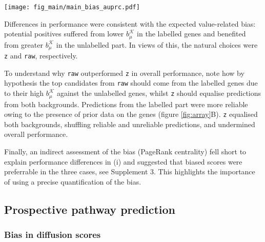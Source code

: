 \documentclass[final]{bioinfo}
\newcommand{\method}{\texttt}
\newcommand{\ebias}{b_{\mu}^{\mathcal{K}}}
\begin{document}
\begin{figure*}[!tpb]%
\centerline{
\texttt{[image: fig\_main/main\_bias\_auprc.pdf]}
}
\caption{Performance in the DLBCL dataset. 
\textbf{(A)} Expected value-related bias. 
Within the labelled genes of both arrays, those in pathways had lower $\ebias$ that those outside. 
Within the unlabelled genes, this tendency was inverted. 
Overall, labelled genes had higher $\ebias$ than unlabelled genes. 
\textbf{(B)} Predicted AUPRC (0.95 confidence interval) using the explanatory model in Table \ref{tab:datasets} and Supplement 3. 
Besides diffusion scores, three baselines were included: \method{original} (ranking by the p-values), \method{pagerank} and \method{random}. 
In both arrays (\textit{ALL} and \textit{Lym}), \method{raw} outperformed \method{z} in unlabelled nodes and overall, while \method{z} was preferable in the labelled genes. 
}\label{fig:array}
\end{figure*}

Differences in performance were consistent with the expected value-related bias: potential positives suffered from lower $\ebias$ in the labelled genes and benefited from greater $\ebias$ in the unlabelled part. 
In views of this, the natural choices were \method{z} and \method{raw}, respectively. 

To understand why \method{raw} outperformed \method{z} in overall performance, note how by hypothesis the top candidates from \method{raw} should come from the labelled genes due to their high $\ebias$ against the unlabelled genes, whilst \method{z} should equalise predictions from both backgrounds. 
Predictions from the labelled part were more reliable owing to the presence of prior data on the genes (figure \ref{fig:array}B). 
\method{z} equalised both backgrounds, shuffling reliable and unreliable predictions, and undermined overall performance. 

Finally, an indirect assessment of the bias (PageRank centrality) fell short to explain performance differences in (i) and suggested that biased scores were preferrable in the three cases, see Supplement 3.
This highlights the importance of using a precise quantification of the bias.

\subsection*{Prospective pathway prediction}

\subsubsection*{Bias in diffusion scores}
\end{document}
